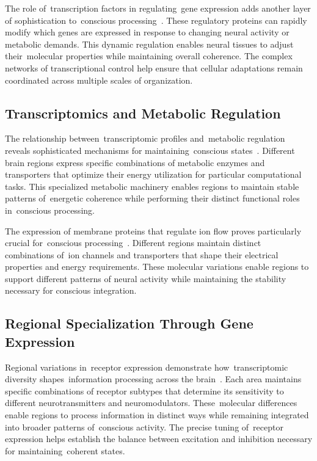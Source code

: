 The role of~transcription factors in regulating~gene expression adds another layer of sophistication to~conscious processing~\cite{Nowakowski2017, Lake2018}. These regulatory proteins can rapidly modify which genes are expressed in response to changing neural activity or metabolic demands. This dynamic regulation enables neural tissues to adjust their~molecular properties while maintaining overall coherence. The complex networks of transcriptional control help ensure that cellular adaptations remain coordinated across multiple scales of organization.

\subsection*{Transcriptomics and Metabolic Regulation~}

The relationship between~transcriptomic profiles and~metabolic regulation reveals sophisticated mechanisms for maintaining~conscious states~\cite{Macosko2015, Magistretti2015}. Different brain regions express specific combinations of metabolic enzymes and transporters that optimize their energy utilization for particular computational tasks. This specialized metabolic machinery enables regions to maintain stable patterns of~energetic coherence while performing their distinct functional roles in~conscious processing.

The expression of membrane proteins that regulate ion flow proves particularly crucial for~conscious processing~\cite{Zeisel2018, Bakken2021}. Different regions maintain distinct combinations of~ion channels and transporters that shape their electrical properties and energy requirements. These molecular variations enable regions to support different patterns of neural activity while maintaining the stability necessary for conscious integration.

\subsection*{Regional Specialization Through Gene Expression~}

Regional variations in~receptor expression demonstrate how~transcriptomic diversity shapes~information processing across the brain~\cite{Saunders2018, Angulo2022}. Each area maintains specific combinations of receptor subtypes that determine its sensitivity to different neurotransmitters and neuromodulators. These~molecular differences enable regions to process information in distinct ways while remaining integrated into broader patterns of~conscious activity. The precise tuning of~receptor expression helps establish the balance between excitation and inhibition necessary for maintaining~coherent states.

